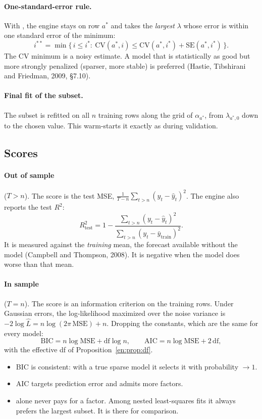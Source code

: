 \paragraph{One-standard-error rule.} With , the engine stays
on row $a^\ast$ and takes the \emph{largest} $\lambda$ whose error is within one standard error
of the minimum:
\[
  i^{\ast\ast}=\min\{\,i\le i^\ast:\ \mathrm{CV}(a^\ast,i)\le\mathrm{CV}(a^\ast,i^\ast)+\mathrm{SE}(a^\ast,i^\ast)\,\}.
\]
The CV minimum is a noisy estimate. A model that is statistically as good but more strongly
penalized (sparser, more stable) is preferred (Hastie, Tibshirani and Friedman, 2009, \S7.10).

\paragraph{Final fit of the subset.} The subset is refitted on all $n$ training rows along the
grid of $\alpha_{a^\ast}$, from $\lambda_{a^\ast,0}$ down to the chosen value. This warm-starts it
exactly as during validation.

\subsection{Scores}\label{en:sec:scores}

\paragraph{Out of sample} ($T>n$). The score is the test MSE,
$\frac1{T-n}\sum_{t>n}(y_t-\hat y_t)^2$. The engine also reports the test $R^2$:
\[
  R^2_{\text{test}}=1-\frac{\sum_{t>n}(y_t-\hat y_t)^2}{\sum_{t>n}(y_t-\bar y_{\text{train}})^2}.
\]
It is measured against the \emph{training} mean, the forecast available without the model
(Campbell and Thompson, 2008). It is negative when the model does worse than that mean.

\paragraph{In sample} ($T=n$). \label{en:sec:insample}
The score is an information criterion on the training rows. Under Gaussian errors, the
log-likelihood maximized over the noise variance is
$-2\log\hat L=n\log(2\pi\,\mathrm{MSE})+n$. Dropping the constants, which are the same for
every model:
\[
  \mathrm{BIC}=n\log\mathrm{MSE}+\mathrm{df}\log n,\qquad
  \mathrm{AIC}=n\log\mathrm{MSE}+2\,\mathrm{df},
\]
with the effective df of Proposition~\ref{en:prop:df}.
\begin{itemize}
  \item BIC is consistent: with a true sparse model it selects it with probability
        $\to1$.
  \item AIC targets prediction error and admits more factors.
  \item {} alone never pays for a factor. Among nested least-squares fits it always
        prefers the largest subset. It is there for comparison.
\end{itemize}

